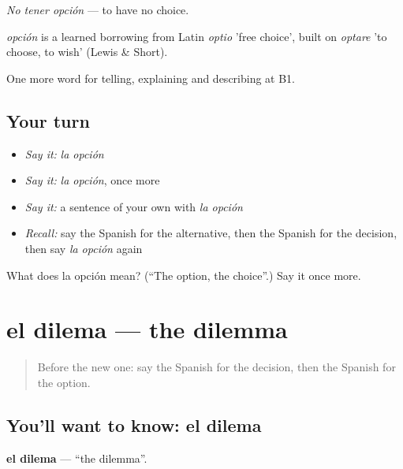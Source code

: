 \emph{No tener opción} — to have no choice.

\begin{cousinweb}
\emph{opción} is a learned borrowing from Latin \emph{optio} 'free choice', built on \emph{optare} 'to choose, to wish' (Lewis \& Short).
\end{cousinweb}

\begin{grammarlens}[title={What you've built}]
One more word for telling, explaining and describing at B1.
\end{grammarlens}

\subsection*{Your turn}
\begin{itemize}
\raggedright
  \item \emph{Say it:} \emph{la opción}
  \item \emph{Say it:} \emph{la opción}, once more
  \item \emph{Say it:} a sentence of your own with \emph{la opción}
  \item \emph{Recall:} say the Spanish for the alternative, then the Spanish for the decision, then say \emph{la opción} again
\end{itemize}

\begin{tcolorbox}[breakable,colback=teal!4,colframe=teal!35!black,title={Before you move on}]
What does la opción mean? (\textquotedblleft{}The option, the choice\textquotedblright{}.) Say it once more.
\end{tcolorbox}
\section[el dilema]{el dilema — the dilemma}

\label{lesson:ES-C617-dilema}



\begin{quote}
Before the new one: say the Spanish for the decision, then the Spanish for the option.
\end{quote}

\subsection*{You'll want to know: el dilema}
\textbf{el dilema} — \textquotedblleft{}the dilemma\textquotedblright{}.


